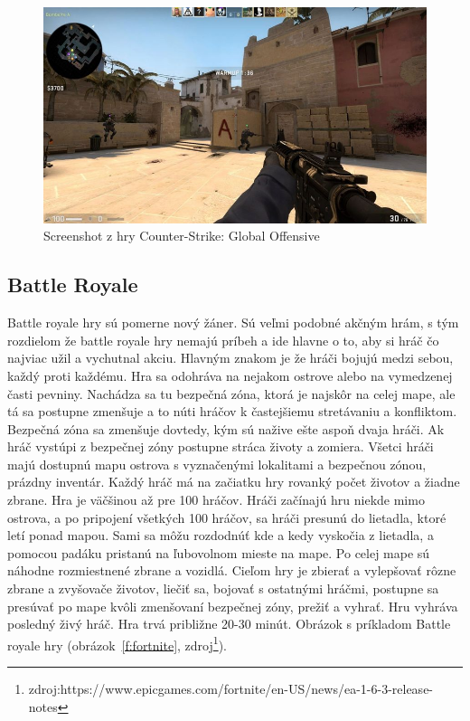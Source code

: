 \documentclass[10pt,oneside,slovak,a4paper]{article}
\begin{document}
\begin{figure}[ht]
\centering
\includegraphics[scale=0.15]{csgo.jpg}
\caption{Screenshot z hry Counter-Strike: Global Offensive}
\label{f:csgo}
\end{figure}

\subsection{Battle Royale} \label{zanre:battleroyale}

Battle royale hry sú pomerne nový žáner. Sú veľmi podobné akčným hrám, s tým rozdielom že battle royale hry nemajú príbeh a ide hlavne o to, aby si hráč čo najviac užil a vychutnal akciu. Hlavným znakom je že hráči bojujú medzi sebou, každý proti každému. Hra sa odohráva na nejakom ostrove alebo na vymedzenej časti pevniny. Nachádza sa tu bezpečná zóna, ktorá je najskôr na celej mape, ale tá sa postupne zmenšuje a to núti hráčov k častejšiemu stretávaniu a konfliktom. Bezpečná zóna sa zmenšuje dovtedy, kým sú nažive ešte aspoň dvaja hráči. Ak hráč vystúpi z bezpečnej zóny postupne stráca životy a zomiera. Všetci hráči majú dostupnú mapu ostrova s vyznačenými lokalitami a bezpečnou zónou, prázdny inventár. Každý hráč má na začiatku hry rovanký počet životov a žiadne zbrane. Hra je väčšinou až pre 100 hráčov. Hráči začínajú hru niekde mimo ostrova, a po pripojení všetkých 100 hráčov, sa hráči presunú do lietadla, ktoré letí ponad mapou. Sami sa môžu rozdodnúť kde a kedy vyskočia z lietadla, a pomocou padáku pristanú na ľubovolnom mieste na mape. Po celej mape sú náhodne rozmiestnené zbrane a vozidlá. Cieľom hry je zbierať a vylepšovať rôzne zbrane a zvyšovače životov, liečiť sa, bojovať s ostatnými hráčmi, postupne sa presúvať po mape kvôli zmenšovaní bezpečnej zóny, prežiť a vyhrať. Hru vyhráva posledný živý hráč. Hra trvá približne 20-30 minút. Obrázok s príkladom Battle royale hry (obrázok~\ref{f:fortnite}, zdroj\footnote{zdroj:https://www.epicgames.com/fortnite/en-US/news/ea-1-6-3-release-notes}).
\end{document}
